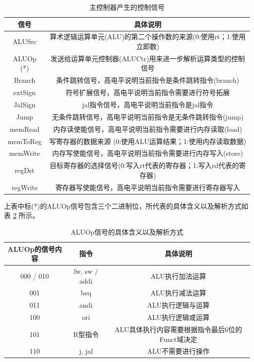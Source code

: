 \documentclass{cumcm}
\numberwithin{equation}{section}
\numberwithin{equation}{subsection}
\begin{document}
\begin{table}[htbp]
    \centering
    \begin{tabular}{|c|c|}
         \hline
         信号 & 具体说明 \\ \hline
         ALUSrc & 算术逻辑运算单元(ALU)的第二个操作数的来源(0:使用rt；1:使用立即数)\\
         ALUOp (*) & 发送给运算单元控制器(ALUCtr)用来进一步解析运算类型的控制信号 \\
         Branch & 条件跳转信号，高电平说明当前指令是条件跳转指令(branch) \\
         extSign & 符号扩展信号，高电平说明当前指令需要进行符号拓展 \\
         JalSign & jal指令信号，高电平说明当前指令是jal指令 \\
         Jump & 无条件跳转信号，高电平说明当前指令是无条件跳转指令(jump) \\
         memRead & 内存读使能信号，高电平说明当前指令需要进行内存读取(load) \\
         memToReg & 写寄存器的数据来源 (0:使用ALU运算结果；1:使用内存读取数据) \\
         memWrite & 内存写使能信号，高电平说明当前指令需要进行内存写入(store) \\
         regDst & 目标寄存器的选择信号(0:写入rt代表的寄存器；1:写入rd代表的寄存器)\\
         regWrite & 寄存器写使能信号，高电平说明当前指令需要进行寄存器写入 \\
         \hline
    \end{tabular}
    \caption{主控制器产生的控制信号}
    \label{tab1}
\end{table}

上表中标(*)的ALUOp信号包含三个二进制位，所代表的具体含义以及解析方式如表 \ref{tab2} 所示。

\begin{table}[htbp]
    \centering
    \begin{tabular}{|c|c|c|}
         \hline
         ALUOp的信号内容 & 指令 & 具体说明 \\
         \hline
         000 / 010 & lw, sw / addi & ALU执行加法运算 \\
         001 & beq & ALU执行减法运算 \\
         011 & andi & ALU执行逻辑与运算 \\
         100 & ori & ALU执行逻辑或运算 \\
         101 & R型指令 & ALU具体执行内容需要根据指令最后6位的Funct域决定 \\
         110 & j, jal & ALU不需要进行操作 \\
         \hline
    \end{tabular}
    \caption{ALUOp信号的具体含义以及解析方式}
    \label{tab2}
\end{table}
\end{document}
